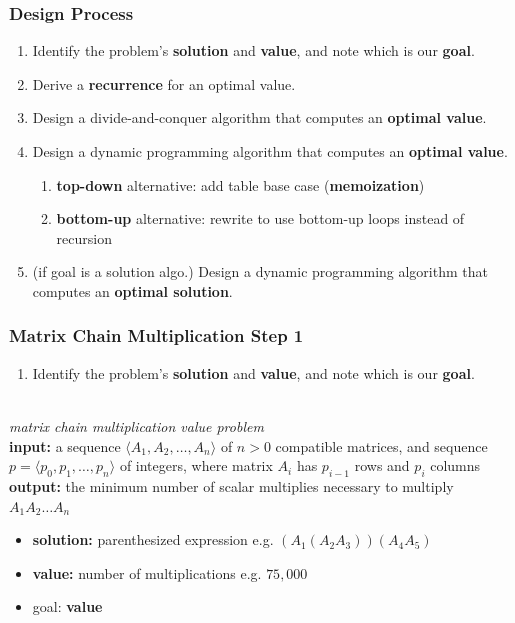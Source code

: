 \documentclass{beamer}
\newcommand{\stanza}{ \\~\ }
\begin{document}
\begin{frame} \frametitle{Design Process}
  \begin{enumerate}
    \item Identify the problem's \textbf{solution} and \textbf{value}, and note which is our \textbf{goal}.
    \item Derive a \textbf{recurrence} for an optimal value.
    \item Design a divide-and-conquer algorithm that computes an \textbf{optimal value}.
    \item Design a dynamic programming algorithm that computes an \textbf{optimal value}.
    \begin{enumerate}
      \item \textbf{top-down} alternative: add table base case (\textbf{memoization})
      \item \textbf{bottom-up} alternative: rewrite to use bottom-up loops instead of recursion
    \end{enumerate}
    \item (if goal is a solution algo.) Design a dynamic programming algorithm that computes an \textbf{optimal solution}.
  \end{enumerate}
  \end{frame}
  
\begin{frame} \frametitle{Matrix Chain Multiplication Step 1}
\begin{enumerate}
  \item Identify the problem's \textbf{solution} and \textbf{value}, and note which is our \textbf{goal}.
  \stanza
\end{enumerate}
\emph{matrix chain multiplication value problem} \\
\textbf{input:} a sequence $\langle A_1, A_2, \ldots, A_n \rangle$ of $n>0$ compatible matrices,
  and sequence $p=\langle p_0, p_1, \ldots, p_n \rangle$ of integers, where
  matrix $A_i$ has $p_{i-1}$ rows and $p_i$ columns \\
\textbf{output:} the minimum number of scalar multiplies necessary to multiply $A_1 A_2 \ldots A_n$ 
\begin{itemize}
  \item \textbf{solution:} parenthesized expression e.g. $(A_1(A_2 A_3))(A_4 A_5)$
  \item \textbf{value:} number of multiplications e.g. $75,000$
  \item goal: \textbf{value}
\end{itemize}
\end{frame}
\end{document}
